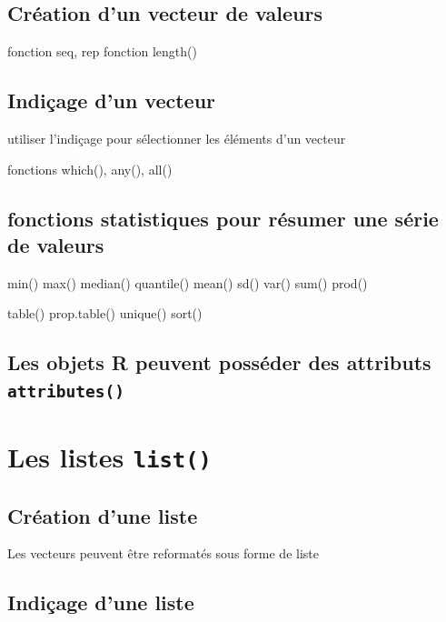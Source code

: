 \documentclass[
]{book}
\begin{document}
\subsection{Création d'un vecteur de valeurs}\label{cruxe9ation-dun-vecteur-de-valeurs}

fonction seq, rep
fonction length()

\subsection{Indiçage d'un vecteur}\label{indiuxe7age-dun-vecteur}

utiliser l'indiçage pour sélectionner les éléments d'un vecteur

fonctions which(), any(), all()

\subsection{fonctions statistiques pour résumer une série de valeurs}\label{fonctions-statistiques-pour-ruxe9sumer-une-suxe9rie-de-valeurs}

min() max() median() quantile()
mean() sd() var()
sum() prod()

table()
prop.table()
unique()
sort()

\subsection{\texorpdfstring{Les objets R peuvent posséder des attributs \texttt{attributes()}}{Les objets R peuvent posséder des attributs attributes()}}\label{les-objets-r-peuvent-possuxe9der-des-attributs-attributes}

\section{\texorpdfstring{Les listes \texttt{list()}}{Les listes list()}}\label{les-listes-list}

\subsection{Création d'une liste}\label{cruxe9ation-dune-liste}

Les vecteurs peuvent être reformatés sous forme de liste

\subsection{Indiçage d'une liste}\label{indiuxe7age-dune-liste}
\end{document}
